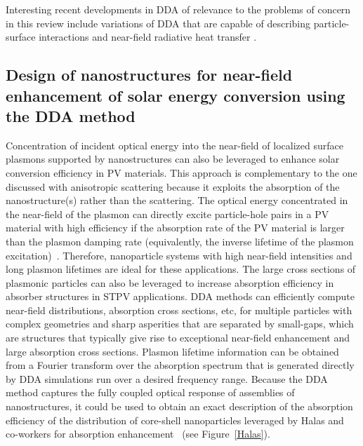 \documentclass[10pt,letterpaper]{article}
\begin{document}
Interesting recent developments in DDA of relevance to the problems of concern in this review include
variations of DDA that are capable of describing particle-surface interactions \cite{loke2010}
and near-field radiative heat transfer \cite{edalatpour2014}.

\subsection{Design of nanostructures for near-field enhancement of solar energy conversion using the DDA method  }

Concentration of incident optical energy into the near-field of localized surface plasmons supported by nanostructures can also be leveraged to enhance
solar conversion efficiency in PV materials.  This approach is complementary to the one discussed with anisotropic scattering because it
exploits the absorption of the nanostructure(s) rather than the scattering.  The optical energy concentrated in the near-field of the
plasmon can directly excite particle-hole pairs in a PV material with high efficiency if the absorption rate of the PV material is 
larger than the plasmon damping rate (equivalently, the inverse lifetime of the plasmon excitation)~\cite{AP_NatMat_2010}.  Therefore, nanoparticle systems with
high near-field intensities and long plasmon lifetimes are ideal for these applications.  The large cross sections of plasmonic particles
can also be leveraged to increase absorption efficiency in absorber structures in STPV applications.  DDA methods can efficiently compute
near-field distributions, absorption cross sections, etc, for multiple particles with complex geometries and sharp asperities that are separated by small-gaps,
which are structures that typically give rise to exceptional near-field enhancement and large absorption cross sections.  
Plasmon lifetime information can be obtained
from a Fourier transform over the absorption spectrum that is generated directly by DDA simulations run over a desired frequency range.
Because the DDA method captures the fully coupled optical response of assemblies of nanostructures, it could be used to obtain 
an exact description of the absorption efficiency of the distribution of core-shell nanoparticles leveraged by Halas and co-workers
for absorption enhancement~\cite{CH_APL_2006} (see Figure~\ref{Halas}).
\end{document}
